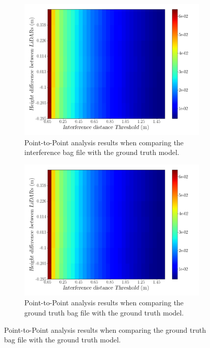 \begin{figure}[!ht]
	\centering
	\begin{subfigure}[c]{0.45\textwidth}
		\includegraphics[width=\textwidth]{img/lidar-interference/height/interference_distance_color_mesh.png}
		\caption{Point-to-Point analysis results when comparing the interference bag file with the ground truth model.}
		\label{fig:height:interference-color-mesh}
	\end{subfigure}
	\qquad
	\begin{subfigure}[c]{0.45\textwidth}
		\includegraphics[width=\textwidth]{img/lidar-interference/height/ground_truth_distance_color_mesh.png}
		\caption{Point-to-Point analysis results when comparing the ground truth bag file with the ground truth model.}

\end{subfigure}
\end{figure}
